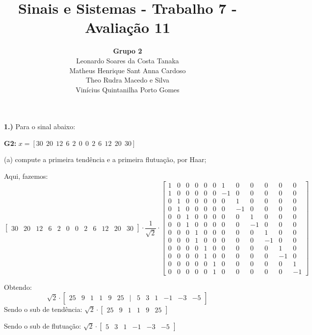 \documentclass[10pt]{article}
\title{Sinais e Sistemas - Trabalho 7 - Avaliação 11}
\author{
    \textbf{Grupo 2}\\
    Leonardo Soares da Costa Tanaka\\
    Matheus Henrique Sant Anna Cardoso\\
    Theo Rudra Macedo e Silva\\
    Vinícius Quintanilha Porto Gomes
}
\date{}
\begin{document}
\maketitle
\thispagestyle{capa}
\newpage

\textbf{1.)} Para o sinal abaixo:

\textbf{G2: } $x = [30 \ \ 20 \ \ 12 \ \ 6 \ \ 2 \ \ 0 \ \ 0 \ \ 2 \ \ 6 \ \ 12 \ \ 20 \ \ 30]$

(a) compute a primeira tendência e a primeira flutuação, por Haar;

Aqui, fazemos:
\[\begin{bmatrix}
    30 & 20 & 12 & 6 & 2 & 0 & 0 & 2 & 6 & 12 & 20 & 30
\end{bmatrix}
\cdot \frac{1}{\sqrt{2}} \cdot
\begin{bmatrix}
    1 & 0 & 0 & 0 & 0 & 0 & 1  & 0  & 0  & 0  & 0  & 0 \\
    1 & 0 & 0 & 0 & 0 & 0 & -1 & 0  & 0  & 0  & 0  & 0 \\
    0 & 1 & 0 & 0 & 0 & 0 & 0  & 1  & 0  & 0  & 0  & 0 \\
    0 & 1 & 0 & 0 & 0 & 0 & 0  & -1 & 0  & 0  & 0  & 0 \\
    0 & 0 & 1 & 0 & 0 & 0 & 0  & 0  & 1  & 0  & 0  & 0 \\
    0 & 0 & 1 & 0 & 0 & 0 & 0  & 0  & -1 & 0  & 0  & 0 \\
    0 & 0 & 0 & 1 & 0 & 0 & 0  & 0  & 0  & 1  & 0  & 0 \\
    0 & 0 & 0 & 1 & 0 & 0 & 0  & 0  & 0  & -1 & 0  & 0 \\
    0 & 0 & 0 & 0 & 1 & 0 & 0  & 0  & 0  & 0  & 1  & 0 \\
    0 & 0 & 0 & 0 & 1 & 0 & 0  & 0  & 0  & 0  & -1 & 0 \\
    0 & 0 & 0 & 0 & 0 & 1 & 0  & 0  & 0  & 0  & 0  & 1 \\
    0 & 0 & 0 & 0 & 0 & 1 & 0  & 0  & 0  & 0  & 0  & -1
\end{bmatrix}\]

Obtendo:
\[\sqrt{2} \cdot \begin{bmatrix}
    25 & 9 & 1 & 1 & 9 & 25 & \mid & 5 & 3 & 1 & -1 & -3 & -5
\end{bmatrix}\]
Sendo o sub de tendência: $\sqrt{2} \cdot \begin{bmatrix}
    25 & 9 & 1 & 1 & 9 & 25
\end{bmatrix}$

Sendo o sub de flutuação: $\sqrt{2} \cdot \begin{bmatrix}
    5 & 3 & 1 & -1 & -3 & -5
\end{bmatrix}$
\end{document}
